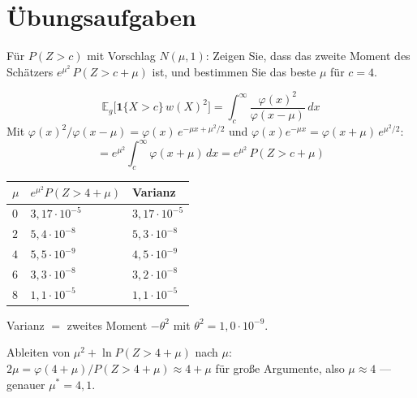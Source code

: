 \section{Übungsaufgaben}

\begin{aufgabe}
Für $P(Z>c)$ mit Vorschlag $N(\mu,1)$: Zeigen Sie, dass das zweite Moment des Schätzers $e^{\mu^2}\,P(Z > c+\mu)$ ist, und bestimmen Sie das beste $\mu$ für $c=4$.

\loesung
{}
\[ \mathbb E_g\big[\mathbf 1\{X>c\}\,w(X)^2\big] = \int_c^\infty \frac{\varphi(x)^2}{\varphi(x-\mu)}\,dx \]
Mit $\varphi(x)^2/\varphi(x-\mu) = \varphi(x)\,e^{-\mu x+\mu^2/2}$ und $\varphi(x)e^{-\mu x} = \varphi(x+\mu)\,e^{\mu^2/2}$:
\[ = e^{\mu^2}\int_c^\infty \varphi(x+\mu)\,dx = e^{\mu^2}\,P(Z > c+\mu) \]

\begin{center}
{\small
\renewcommand{\arraystretch}{1.48}
\begin{tabular}{@{}P{1.2cm}P{2.8cm}P{2.8cm}@{}}
\toprule
$\mu$ & $e^{\mu^2}P(Z>4+\mu)$ & \textbf{Varianz}\\
\midrule
$0$ & $3{,}17\cdot10^{-5}$ & $3{,}17\cdot10^{-5}$\\
$2$ & $5{,}4\cdot10^{-8}$ & $5{,}3\cdot10^{-8}$\\
$4$ & $5{,}5\cdot10^{-9}$ & $4{,}5\cdot10^{-9}$\\
$6$ & $3{,}3\cdot10^{-8}$ & $3{,}2\cdot10^{-8}$\\
$8$ & $1{,}1\cdot10^{-5}$ & $1{,}1\cdot10^{-5}$\\
\bottomrule
\end{tabular}}
\end{center}
Varianz $=$ zweites Moment $- \theta^2$ mit $\theta^2 = 1{,}0\cdot10^{-9}$.

Ableiten von $\mu^2 + \ln P(Z>4+\mu)$ nach $\mu$: $2\mu = \varphi(4+\mu)/P(Z>4+\mu) \approx 4+\mu$ für große Argumente, also $\mu \approx 4$ --- genauer $\mu^* = 4{,}1$.

\begin{center}
\begin{minipage}{0.88\textwidth}
\end{minipage}
\end{center}
\end{aufgabe}

